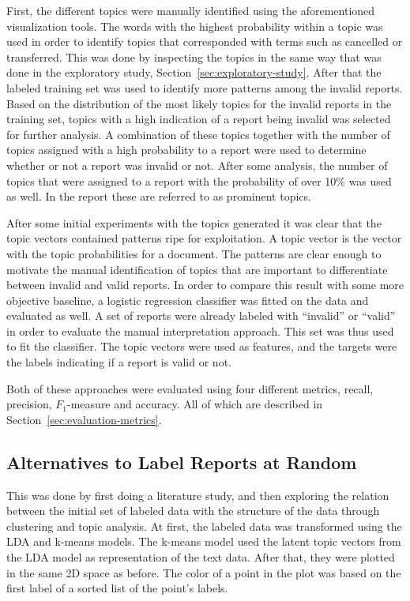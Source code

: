 First, the different topics were manually identified using the aforementioned visualization tools.
The words with the highest probability within a topic was used in order to identify topics that corresponded with terms such as cancelled or transferred.
This was done by inspecting the topics in the same way that was done in the exploratory study, Section~\ref{sec:exploratory-study}.
After that the labeled training set was used to identify more patterns among the invalid reports.
Based on the distribution of the most likely topics for the invalid reports in the training set, topics with a high indication of a report being invalid was selected for further analysis.
A combination of these topics together with the number of topics assigned with a high probability to a report were used to determine whether or not a report was invalid or not.
After some analysis, the number of topics that were assigned to a report with the probability of over 10\% was used as well.
In the report these are referred to as prominent topics.

After some initial experiments with the topics generated it was clear that the topic vectors contained patterns ripe for exploitation.
A topic vector is the vector with the topic probabilities for a document.
The patterns are clear enough to motivate the manual identification of topics that are important to differentiate between invalid and valid reports.
In order to compare this result with some more objective baseline, a logistic regression classifier was fitted on the data and evaluated as well.
A set of reports were already labeled with ``invalid'' or ``valid'' in order to evaluate the manual interpretation approach.
This set was thus used to fit the classifier.
The topic vectors were used as features, and the targets were the labels indicating if a report is valid or not.

Both of these approaches were evaluated using four different metrics, recall, precision, $F_1$-measure and accuracy.
All of which are described in Section~\ref{sec:evaluation-metrics}.

\subsection{Alternatives to Label Reports at Random}\label{sec:exp2-method}

This was done by first doing a literature study, and then exploring the relation between the initial set of labeled data with the structure of the data through clustering and topic analysis.
At first, the labeled data was transformed using the LDA and k-means models.
The k-means model used the latent topic vectors from the LDA model as representation of the text data.
After that, they were plotted in the same 2D space as before.
The color of a point in the plot was based on the first label of a sorted list of the point's labels.

